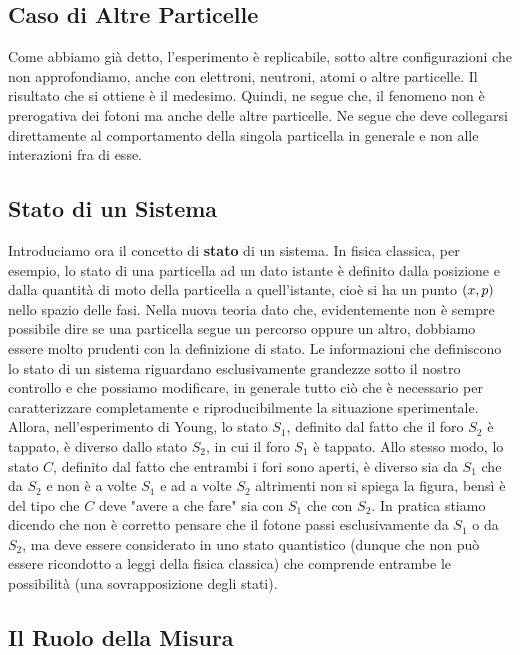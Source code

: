 \subsection{Caso di Altre Particelle}

	Come abbiamo già detto, l'esperimento è replicabile, sotto altre configurazioni che non approfondiamo, anche con elettroni, neutroni, atomi o altre particelle. Il risultato che si ottiene è il medesimo. Quindi, ne segue che, il fenomeno non è prerogativa dei fotoni ma anche delle altre particelle. Ne segue che deve collegarsi direttamente al comportamento della singola particella in generale e non alle interazioni fra di esse.

\subsection{Stato di un Sistema}

	Introduciamo ora il concetto di \textbf{stato} di un sistema. In fisica classica, per esempio, lo stato di una particella ad un dato istante è definito dalla posizione e dalla quantità di moto della particella a quell’istante, cioè si ha un punto $\qty(x, p)$ nello spazio delle fasi. Nella nuova teoria dato che, evidentemente non è sempre possibile dire se una particella segue un percorso oppure un altro, dobbiamo essere molto prudenti con la definizione di stato. Le informazioni che definiscono lo stato di un sistema riguardano esclusivamente grandezze sotto il nostro controllo e che possiamo modificare, in generale tutto ciò che è necessario per caratterizzare completamente e riproducibilmente la situazione sperimentale. Allora, nell’esperimento di Young, lo stato $S_1$, definito dal fatto che il foro $S_2$ è tappato, è diverso dallo stato $S_2$, in cui il foro $S_1$ è tappato. Allo stesso modo, lo stato $C$, definito dal fatto che entrambi i fori sono aperti, è diverso sia da $S_1$ che da $S_2$ e non è a volte $S_1$ e ad a volte $S_2$ altrimenti non si spiega la figura, bensì è del tipo che $C$ deve "avere a che fare" sia con $S_1$ che con $S_2$. In pratica stiamo dicendo che non è corretto pensare che il fotone passi esclusivamente da $S_1$ o da $S_2$, ma deve essere considerato in uno stato quantistico (dunque che non può essere ricondotto a leggi della fisica classica) che comprende entrambe le possibilità (una sovrapposizione degli stati).

\subsection{Il Ruolo della Misura}

